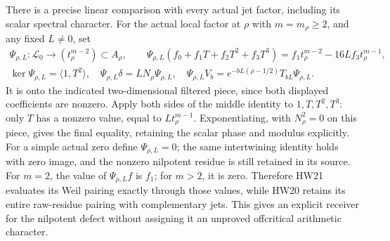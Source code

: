 There is a precise linear comparison with every actual
jet factor, including its scalar spectral character.
For the actual local factor at \(\rho\) with \(m=m_\rho\ge2\),
and any fixed \(L\ne0\), set
\[
 \begin{gathered}
 \Psi_{\rho,L}:\mathscr L_0\longrightarrow
                 (t_\rho^{m-2})\subset A_\rho,\qquad
 \Psi_{\rho,L}(f_0+f_1T+f_2T^2+f_3T^3)
       =f_1t_\rho^{m-2}-16L f_3t_\rho^{m-1},\\
 \ker\Psi_{\rho,L}=\langle1,T^2\rangle,\quad
 \Psi_{\rho,L}\delta=L N_\rho\Psi_{\rho,L},\quad
 \Psi_{\rho,L}V_b=
   e^{-bL(\rho-1/2)}T_{bL}\Psi_{\rho,L}.
 \end{gathered}
 \tag{HW64}\label{hw:residuejet}
\]
It is onto the indicated two-dimensional filtered piece,
since both displayed coefficients are nonzero. Apply both
sides of the middle identity to \(1,T,T^2,T^3\): only
\(T\) has a nonzero value, equal to \(L t_\rho^{m-1}\).
Exponentiating, with \(N_\rho^2=0\) on this piece,
gives the final equality, retaining the scalar phase and
modulus explicitly. For a simple actual zero define
\(\Psi_{\rho,L}=0\); the same intertwining identity holds
with zero image, and the nonzero nilpotent residue is
still retained in its source.
For \(m=2\), the value of \(\Psi_{\rho,L}f\) is \(f_1\);
for \(m>2\), it is zero. Therefore HW21 evaluates its
Weil pairing exactly through those values, while HW20
retains its entire raw-residue pairing with complementary
jets. This gives an explicit receiver for the nilpotent
defect without assigning it an unproved offcritical
arithmetic character.

